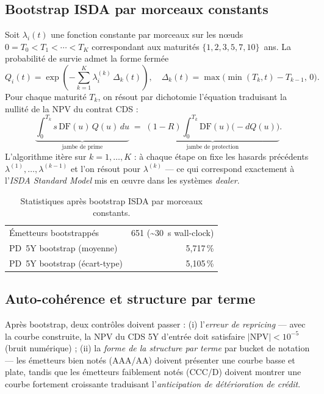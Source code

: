 \documentclass[11pt,a4paper]{article}
\newcommand{\DF}{\mathrm{DF}}
\begin{document}
\subsection{Bootstrap ISDA par morceaux constants}
Soit $\lambda_i(t)$ une fonction constante par morceaux sur les n\oe uds
$0 = T_0 < T_1 < \cdots < T_K$ correspondant aux maturités $\{1, 2, 3, 5, 7, 10\}$~ans.
La probabilité de survie admet la forme fermée
\begin{equation}
Q_i(t) = \exp\!\left(-\sum_{k=1}^K \lambda_i^{(k)}\,\Delta_k(t)\right),
\quad
\Delta_k(t) = \max\!\bigl(\min(T_k, t) - T_{k-1},\, 0\bigr).
\label{eq:Q_pwc}
\end{equation}
Pour chaque maturité $T_k$, on résout par dichotomie l'équation traduisant la
nullité de la NPV du contrat CDS :
\begin{equation}
\underbrace{\int_0^{T_k} s\,\DF(u)\,Q(u)\,du}_{\text{jambe de prime}}
\;=\;
\underbrace{(1-R)\int_0^{T_k} \DF(u)\bigl(-dQ(u)\bigr)}_{\text{jambe de protection}}.
\label{eq:CDS_bootstrap}
\end{equation}
L'algorithme itère sur $k = 1, \dots, K$ : à chaque étape on fixe les hasards
précédents $\lambda^{(1)}, \dots, \lambda^{(k-1)}$ et l'on résout pour
$\lambda^{(k)}$ --- ce qui correspond exactement à l'\emph{ISDA Standard Model}
mis en \oe uvre dans les systèmes \emph{dealer}.

\begin{table}[H]
\centering
\begin{tabular}{lr}
\toprule
Émetteurs bootstrappés        & 651 (\textasciitilde 30~s wall-clock) \\
PD~5Y bootstrap (moyenne)     & 5,717\,\% \\
PD~5Y bootstrap (écart-type)  & 5,105\,\% \\
\bottomrule
\end{tabular}
\caption{Statistiques après bootstrap ISDA par morceaux constants.}
\end{table}

\subsection{Auto-cohérence et structure par terme}

Après bootstrap, deux contrôles doivent passer : (i) l'\emph{erreur de repricing}
--- avec la courbe construite, la NPV du CDS 5Y d'entrée doit satisfaire
$|\text{NPV}| < 10^{-5}$ (bruit numérique) ; (ii) la \emph{forme de la structure
par terme} par bucket de notation --- les émetteurs bien notés (AAA/AA) doivent
présenter une courbe basse et plate, tandis que les émetteurs faiblement notés
(CCC/D) doivent montrer une courbe fortement croissante traduisant
l'\emph{anticipation de détérioration de crédit}.
\end{document}
